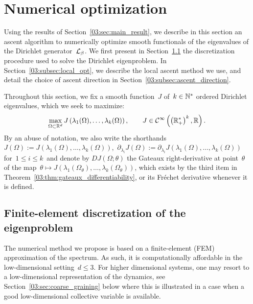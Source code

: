 \section{Numerical optimization}
\label{03:sec:ascent}
Using the results of Section~\ref{03:sec:main_result}, we describe in this section an ascent algorithm to numerically optimize smooth functionals of the eigenvalues of the Dirichlet generator~$\mathcal{L}_\beta$.
We first present in Section~\ref{03:subsec:fem} the discretization procedure used to solve the Dirichlet eigenproblem. In Section~\ref{03:subsec:local_opt}, we describe the local ascent method we use, and detail the choice of ascent direction in Section~\ref{03:subsec:ascent_direction}. 

Throughout this section, we fix a smooth function~$J$ of~$k\in \mathbb{N}^*$ ordered Dirichlet eigenvalues, which we seek to maximize:
\begin{equation}
    \label{03:eq:functional}
        \underset{\Omega\subset\mathbb{R}^d}{\max}\, J\left(\lambda_1(\Omega),\dots,\lambda_{k}(\Omega)\right),\qquad J \in \mathcal C^{\infty}\left(\left(\mathbb{R}_+^*\right)^k,\mathbb{R}\right).
\end{equation}
By an abuse of notation, we also write the shorthands $J(\Omega):=J\left(\lambda_1(\Omega),\dots,\lambda_{k}(\Omega)\right)$,~$\partial_{\lambda_i} J(\Omega):= \partial_{\lambda_i} J(\lambda_1(\Omega),\dots,\lambda_k(\Omega))$ for~$1\leq i\leq k$~and denote by $DJ(\Omega;\theta)$ the Gateaux right-derivative at point~$\theta$ of the map~$\theta\mapsto J\left(\lambda_1(\Omega_\theta),\dots,\lambda_k(\Omega_\theta)\right)$, which exists by the third item in Theorem~\ref{03:thm:gateaux_differentiability}, or its Fr\'echet derivative whenever it is defined.

\subsection{Finite-element discretization of the eigenproblem}
\label{03:subsec:fem}
The numerical method we propose is based on a finite-element (FEM) approximation of the spectrum. As such, it is computationally affordable in the low-dimensional setting~$d\leq 3$.
For higher dimensional systems, one may resort to a low-dimensional representation of the dynamics, see Section~\ref{03:sec:coarse_graining} below where this is illustrated in a case when a good low-dimensional collective variable is available.
